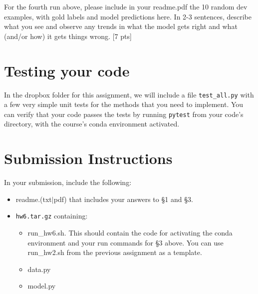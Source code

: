 \documentclass[11pt]{article}
\begin{document}
\vspace{2em}
 For the fourth run above, please include in your readme.pdf the 10 random dev examples, with gold labels and model predictions here.  In 2-3 sentences, describe what you see and observe any trends in what the model gets right and what (and/or how) it gets things wrong. \hfill [7 pts]


\section{Testing your code}

In the dropbox folder for this assignment, we will include a file \texttt{test\_all.py} with a few very simple unit tests for the methods that you need to implement.  You can verify that your code passes the tests by running \texttt{pytest} from your code's directory, with the course's conda environment activated.


\section*{Submission Instructions}

In your submission, include the following:
\begin{itemize}
  \item readme.(txt$\mid$pdf) that includes your answers to \S1 and \S3. 
  \item \texttt{hw6.tar.gz} containing:
  \begin{itemize}
    \item run\_hw6.sh.  This should contain the code for activating the conda environment and your run commands for \S3 above.  You can use run\_hw2.sh from the previous assignment as a template.
    \item data.py
    \item model.py
  \end{itemize}
\end{itemize}
\end{document}
